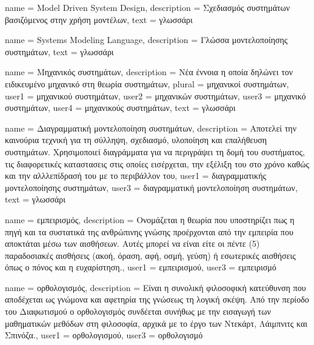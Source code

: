 
	{name			= {Model Driven System Design},
	 description	= {Σχεδιασμός συστημάτων βασιζόμενος στην χρήση μοντέλων},
	 text			= {γλωσσάρι}
	}
	
	{name			= {Systems Modeling Language},
	 description	= {Γλώσσα μοντελοποίησης συστημάτων},
	 text			= {γλωσσάρι}
	}
	
	{name			= {Μηχανικός συστημάτων},
	 description	= {Νέα έννοια η οποία δηλώνει τον ειδικευμένο μηχανικό στη θεωρία συστημάτων},
	 plural			= {μηχανικοί συστημάτων},
	 user1			= {μηχανικού συστημάτων},
	 user2			= {μηχανικών συστημάτων},
	 user3			= {μηχανικό συστημάτων},
	 user4			= {μηχανικούς συστημάτων},
	 text			= {γλωσσάρι}
	}
	
	{name			= {Διαγραμματική μοντελοποίηση συστημάτων},
	 description	= {Αποτελεί την καινούρια τεχνική για τη σύλληψη, σχεδιασμό, υλοποίηση και επαλήθευση συστημάτων. Χρησιμοποιεί διαγράμματα για να περιγράψει τη δομή του συστήματος, τις διαφορετικές καταστασεις στις οποίες εισέρχεται, την εξέλιξη του στο χρόνο καθώς και την αλλλεπίδρασή του με το περιβάλλον του},
	 user1			= {διαγραμματικής μοντελοποίησης συστημάτων},
	 user3			= {διαγραμματική μοντελοποίηση συστημάτων},
	 text			= {γλωσσάρι}
	}
	
	{name			= {εμπειρισμός},
	 description	= {Ονομάζεται η θεωρία που υποστηρίζει πως η πηγή και τα συστατικά της ανθρώπινης γνώσης προέρχονται από την εμπειρία που αποκτάται μέσω των αισθήσεων. Αυτές μπορεί να είναι είτε οι πέντε (5) παραδοσιακές αισθήσεις (ακοή, όραση, αφή, οσμή, γεύση) ή εσωτερικές αισθήσεις όπως ο πόνος και η ευχαρίστηση.},
	 user1			= {εμπειρισμού},
	 user3			= {εμπειρισμό}
	}
	
	{name			= {ορθολογισμός},
	 description	= {Είναι η συνολική φιλοσοφική κατεύθυνση που αποδέχεται ως γνώμονα και αφετηρία της γνώσεως τη λογική σκέψη. Από την περίοδο του Διαφωτισμού ο ορθολογισμός συνδέεται συνήθως με την εισαγωγή των μαθηματικών μεθόδων στη φιλοσοφία, αρχικά με το έργο των Ντεκάρτ, Λάιμπνιτς και Σπινόζα.},
	 user1			= {ορθολογισμού},
	 user3			= {ορθολογισμό}
	}
	
